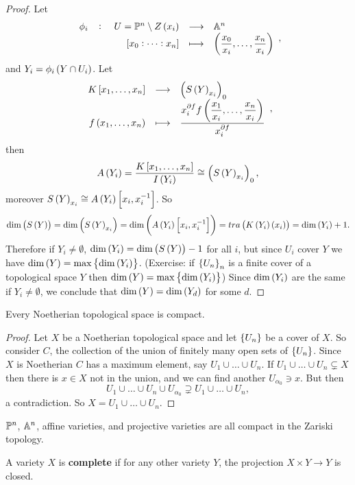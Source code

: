 \begin{proof}
Let
$$ \function[\phi_i]{U = \P^n \setminus Z\br{x_i}}{\A^n}{\sbr{x_0 : \dots : x_n}}{\br{\dfrac{x_0}{x_i}, \dots, \dfrac{x_n}{x_i}}}, $$
and $ Y_i = \phi_i\br{Y \cap U_i} $. Let
$$ \function{K\sbr{x_1, \dots, x_n}}{\br{S\br{Y}_{x_i}}_0}{f\br{x_1, \dots, x_n}}{\dfrac{x_i^{\partial f}f\br{\dfrac{x_1}{x_i}, \dots, \dfrac{x_n}{x_i}}}{x_i^{\partial f}}}, $$
then
$$ A\br{Y_i} = \dfrac{K\sbr{x_1, \dots, x_n}}{I\br{Y_i}} \cong \br{S\br{Y}_{x_i}}_0, $$
moreover $ S\br{Y}_{x_i} \cong A\br{Y_i}\sbr{x_i, x_i^{-1}} $. So
$$ \dim\br{S\br{Y}} = \dim\br{S\br{Y}_{x_i}} = \dim\br{A\br{Y_i}\sbr{x_i, x_i^{-1}}} = tra\br{K\br{Y_i}\br{x_i}} = \dim\br{Y_i} + 1. $$
Therefore if $ Y_i \ne \emptyset $, $ \dim\br{Y_i} = \dim\br{S\br{Y}} - 1 $ for all $ i $, but since $ U_i $ cover $ Y $ we have $ \dim\br{Y} = \max\cbr{\dim\br{Y_i}} $. (Exercise: if $ \cbr{U_n}_n $ is a finite cover of a topological space $ Y $ then $ \dim\br{Y} = \max\cbr{\dim\br{Y_i}} $) Since $ \dim\br{Y_i} $ are the same if $ Y_i \ne \emptyset $, we conclude that $ \dim\br{Y} = \dim\br{Y_d} $ for some $ d $.
\end{proof}


\begin{proposition}
Every Noetherian topological space is compact.
\end{proposition}

\begin{proof}
Let $ X $ be a Noetherian topological space and let $ \cbr{U_n} $ be a cover of $ X $. So consider $ C $, the collection of the union of finitely many open sets of $ \cbr{U_n} $. Since $ X $ is Noetherian $ C $ has a maximum element, say $ U_1 \cup \dots \cup U_n $. If $ U_1 \cup \dots \cup U_n \subsetneq X $ then there is $ x \in X $ not in the union, and we can find another $ U_{\alpha_0} \ni x $. But then
$$ U_1 \cup \dots \cup U_n \cup U_{\alpha_0} \supsetneq U_1 \cup \dots \cup U_n, $$
a contradiction. So $ X = U_1 \cup \dots \cup U_n $.
\end{proof}

\begin{corollary}
$ \P^n $, $ \A^n $, affine varieties, and projective varieties are all compact in the Zariski topology.
\end{corollary}

\begin{definition}
A variety $ X $ is \textbf{complete} if for any other variety $ Y $, the projection $ X \times Y \to Y $ is closed.
\end{definition}

